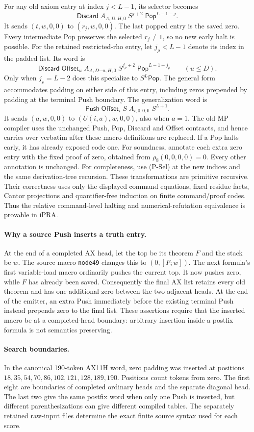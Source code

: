 For any old axiom entry at index $j<L-1$, its selector becomes
\[
 \mathsf{Discard}\;A_{A,D,H,0}\;S^{j+2}\;
                    \mathsf{Pop}^{L-1-j}.             \tag{P-Sel}
\]
It sends $(t,w,0,0)$ to $(r_j,w,0,0)$. The last popped entry is the saved
zero. Every intermediate Pop preserves the selected $r_j\ne1$, so no
new early halt is possible. For the retained restricted-rho entry, let
$j_\rho<L-1$ denote its index in the padded list. Its word is
\[
 \mathsf{Discard}\;\mathsf{Offset}_u\;
 A_{A,D\mathbin{\dot{-}}u,H,0}\;S^{j_\rho+2}\;
 \mathsf{Pop}^{L-1-j_\rho}
 \qquad(u\le D).
\]
Only when $j_\rho=L-2$ does this specialize to $S^L\mathsf{Pop}$.
The general form accommodates padding on either side of this entry,
including zeros prepended by padding at the terminal Push boundary.
The generalization word is
\[
 \mathsf{Push}\;\mathsf{Offset}_i\;S\;
 A_{i,0,0,0}\;S^{L+1}.
\]
It sends $(a,w,0,0)$ to $(U(i,a),w,0,0)$, also when $a=1$.
The old MP compiler uses the unchanged Push, Pop, Discard and Offset
contracts, and hence carries over verbatim after these macro definitions
are replaced. If a Pop halts early, it has already exposed code one.
For soundness, annotate each extra zero entry with the fixed proof of
zero, obtained from $\rho_8(0,0,0,0)=0$. Every other annotation is
unchanged. For completeness, use (P-Sel) at the new indices and the
same derivation-tree recursion. These transformations are primitive
recursive. Their correctness uses only the displayed command equations,
fixed residue facts, Cantor projections and quantifier-free induction on
finite command/proof codes. Thus the relative command-level halting
and numerical-refutation equivalence is provable in iPRA.

\paragraph{Why a source Push inserts a truth entry.}
At the end of a completed AX head, let the top be its theorem $F$ and
the stack be $w$. The source macro \texttt{node49} changes this to
$(0,[F;w])$. The next formula's first variable-load macro ordinarily
pushes the current top. It now pushes zero, while $F$ has already been
saved. Consequently the final AX list retains every old theorem and
has one additional zero between the two adjacent heads. At the end of
the emitter, an extra Push immediately before the existing terminal
Push instead prepends zero to the final list. These assertions require
that the inserted macro be at a completed-head boundary: arbitrary
insertion inside a postfix formula is not semantics preserving.

\paragraph{Search boundaries.}
In the canonical 190-token AX11H word, zero padding was inserted at
positions $18,35,54,70,86,102,121,128,189,190$. Positions count tokens
from zero. The first eight are boundaries of completed ordinary heads
and the separate diagonal head. The last two give the same postfix
word when only one Push is inserted, but different parenthesizations
can give different compiled tables. The separately retained raw-input
files determine the exact finite source syntax used for each score.
